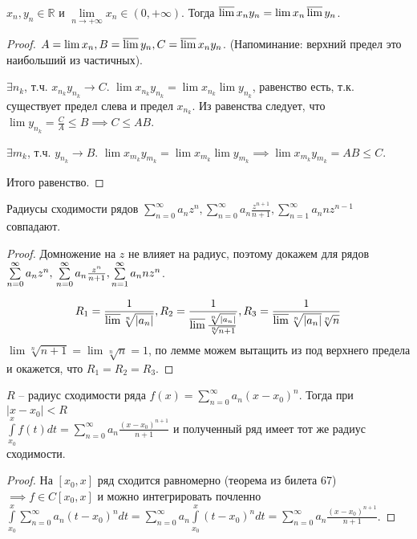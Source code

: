 \begin{lemma} \thmslashn

	$x_n, y_n \in \mathbb{R}$ и $\lim\limits_{n\to+\infty}x_n \in (0, +\infty)$. Тогда $\varlimsup x_ny_n = \lim x_n\varlimsup y_n$. 
	\begin{proof} \thmslashn
		
		$A = \lim x_n, B = \varlimsup y_n, C = \varlimsup x_ny_n$. (Напоминание: верхний предел это наибольший из частичных).
		
		$\exists n_k$, т.ч. $x_{n_k}y_{n_k} \to C$. $\lim x_{n_k}y_{n_k} = \lim x_{n_k} \lim y_{n_k}$, равенство есть, т.к. существует предел слева и предел $x_{n_k}$. Из равенства следует, что $\lim y_{n_k} = \frac{C}{A} \le B \implies C \le AB$.
		
		$\exists m_k$, т.ч. $y_{n_k} \to B$. $\lim x_{m_k}y_{m_k} = \lim x_{m_k} \lim y_{m_k} \implies \lim x_{m_k}y_{m_k} = AB \le C$. 
		
		Итого равенство.
	\end{proof}
\end{lemma}

\begin{consequence} \thmslashn

	Радиусы сходимости рядов $\sum\limits_{n = 0}^{\infty}a_nz^n, \sum\limits_{n = 0}^{\infty}a_n\frac{z^{n + 1}}{n + 1}, \sum\limits_{n = 1}^{\infty}a_nnz^{n - 1}$ совпадают.
	\begin{proof} \thmslashn
		
		Домножение на $z$ не влияет на радиус, поэтому докажем для рядов 
		$\sum\limits_{n = 0}^{\infty}a_nz^n,\\ \sum\limits_{n = 0}^{\infty}a_n\frac{z^{n}}{n + 1}, \sum\limits_{n = 1}^{\infty}a_nnz^{n}$.
		
		\[
		R_1 = \frac{1}{\varlimsup \sqrt[n]{|a_n|}}, R_2 = \frac{1}{\varlimsup \frac{\sqrt[n]{|a_n|}}{\sqrt[n]{n + 1}}}, R_3 = \frac{1}{\varlimsup \sqrt[n]{|a_n|}\sqrt[n]{n}}
		\]
		$\lim\sqrt[n]{n + 1} = \lim\sqrt[n]{n} = 1$, по лемме можем вытащить из под верхнего предела и окажется, что $R_1 = R_2 = R_3$.
	\end{proof}
\end{consequence}

\begin{theorem} \thmslashn

$R$ -- радиус сходимости ряда $f(x) = \sum\limits_{n = 0}^{\infty}a_n(x - x_0)^n$. Тогда при $|x - x_0| < R$\\ $\int\limits_{x_0}^{x}f(t)dt = \sum\limits_{n = 0}^{\infty}a_n\frac{(x - x_0)^{n + 1}}{n + 1}$ и полученный ряд имеет тот же радиус сходимости.
\begin{proof} \thmslashn
	
	На $[x_0, x]$ ряд сходится равномерно (теорема из билета 67)$\implies f \in C[x_0, x]$ и можно интегрировать почленно $\int\limits_{x_0}^{x}\sum\limits_{n = 0}^{\infty}a_n(t - x_0)^ndt = \sum\limits_{n = 0}^{\infty}a_n\int\limits_{x_0}^{x}(t - x_0)^ndt = \sum\limits_{n = 0}^{\infty}a_n\frac{(x - x_0)^{n + 1}}{n + 1}$.
\end{proof}
\end{theorem}
